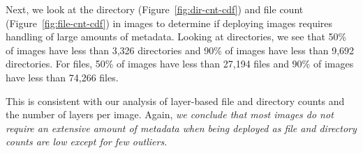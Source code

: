 Next, we look at the directory (Figure~\ref{fig:dir-cnt-cdf}) and file count
(Figure~\ref{fig:file-cnt-cdf}) in images to determine if deploying images
requires handling of large amounts of metadata.
%
Looking at directories, we see that 50\% of images have less than 3,326
directories and 90\% of images have less than 9,692 directories.
%
For files, 50\% of images have less than 27,194 files and 90\% of images have
less than 74,266 files.

This is consistent with our analysis of layer-based file and directory counts
and the number of layers per image.
%
Again, \textit{we conclude that most images do not require an extensive amount
of metadata when being deployed as file and directory counts are low except for
few outliers.}


%

